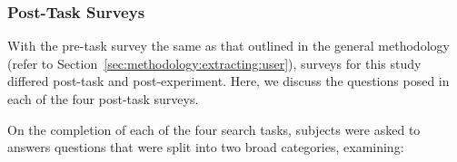 %
%

\subsubsection{Post-Task Surveys}\label{sec:diversity:users:posttask}
With the pre-task survey the same as that outlined in the general methodology (refer to Section~\ref{sec:methodology:extracting:user}), surveys for this study differed post-task and post-experiment. Here, we discuss the questions posed in each of the four post-task surveys.

On the completion of each of the four search tasks, subjects were asked to answers questions that were split into two broad categories, examining:


